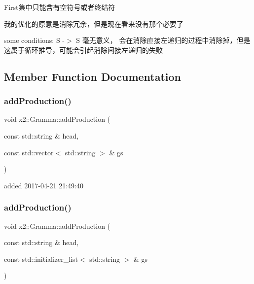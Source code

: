 First集中只能含有空符号或者终结符

我的优化的原意是消除冗余，但是现在看来没有那个必要了

some conditions\+: S -\/$>$ S 毫无意义， 会在消除直接左递归的过程中消除掉，但是这属于循环推导，可能会引起消除间接左递归的失败 

\subsection{Member Function Documentation}
\mbox{\label{classx2_1_1_gramma_aaf4cbec7886ba7eaf878ca75a517e4e0}} 
\subsubsection{\texorpdfstring{add\+Production()}{addProduction()}\hspace{0.1cm}{\footnotesize\ttfamily [1/2]}}
{\footnotesize\ttfamily void x2\+::\+Gramma\+::add\+Production (\begin{DoxyParamCaption}\item[{const std\+::string \&}]{head,  }\item[{const std\+::vector$<$ std\+::string $>$ \&}]{gs }\end{DoxyParamCaption})\hspace{0.3cm}{\ttfamily [inline]}}

added 2017-\/04-\/21 21\+:49\+:40 \mbox{\label{classx2_1_1_gramma_a86ff823a6b5aefacbc9a024414c078d8}} 
\subsubsection{\texorpdfstring{add\+Production()}{addProduction()}\hspace{0.1cm}{\footnotesize\ttfamily [2/2]}}
{\footnotesize\ttfamily void x2\+::\+Gramma\+::add\+Production (\begin{DoxyParamCaption}\item[{const std\+::string \&}]{head,  }\item[{const std\+::initializer\+\_\+list$<$ std\+::string $>$ \&}]{gs }\end{DoxyParamCaption})\hspace{0.3cm}{\ttfamily [inline]}}


